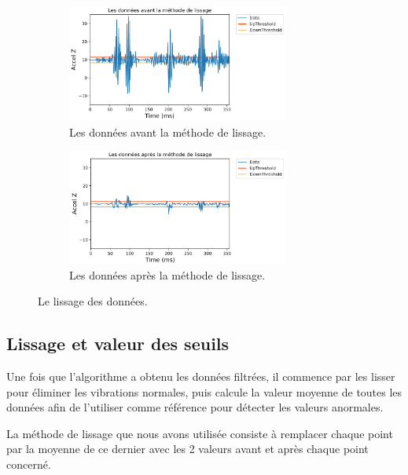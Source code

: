 \begin{figure}[h!]
  \center
  \begin{subfigure}{.75\textwidth}
      \center
      \includegraphics[width=0.8\textwidth]{Images/chapter2/approache/avantissage.png}
      \caption{Les données avant la méthode de lissage.}
      \label{fig:avantlissage}
  \end{subfigure}
  \begin{subfigure}{.75\textwidth}
      \center
      \includegraphics[width=0.8\textwidth]{Images/chapter2/approache/apreslissage.png}
      \caption{Les données après la méthode de lissage.}
      \label{fig:apreslissage}
  \end{subfigure}
 
  \caption{Le lissage des données.}
  \label{fig:lissage}
\end{figure}

\subsection{Lissage et valeur des seuils}
Une fois que l’algorithme a obtenu les données filtrées, il commence par les lisser pour éliminer les vibrations normales, puis calcule la valeur moyenne de toutes les données afin de l’utiliser comme référence pour détecter les valeurs anormales.

La méthode de lissage que nous avons utilisée consiste à remplacer chaque point par la moyenne de ce dernier avec les 2 valeurs avant et après chaque point concerné. 

